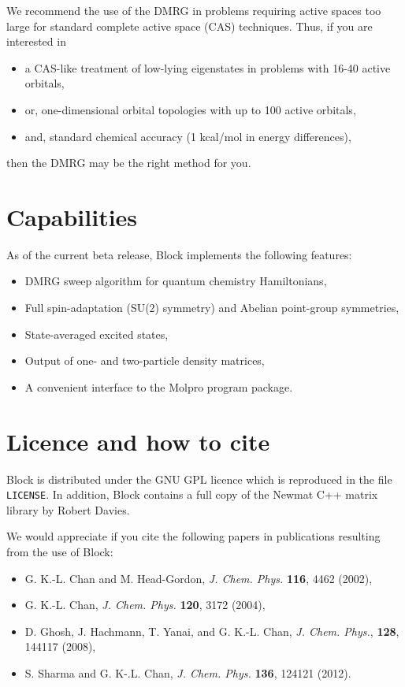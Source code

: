 \documentclass[letterpaper,12pt,aps, pra]{revtex4-1}
\begin{document}
We recommend the use of the DMRG in problems requiring active spaces too large for standard 
complete active space (CAS) techniques. Thus, if you are interested in
\begin{itemize}
\item a CAS-like treatment of low-lying eigenstates in problems with 16-40 active orbitals,
\item or, one-dimensional orbital topologies with up to 100 active orbitals,
\item and, standard chemical accuracy (1 kcal/mol in energy differences),
\end{itemize}
then the DMRG may be the right method for you.

\section{Capabilities}

As of the current beta release, Block implements the following features:
\begin{itemize}
\item DMRG sweep algorithm for quantum chemistry Hamiltonians,
\item Full spin-adaptation (SU(2) symmetry) and Abelian point-group symmetries,
\item State-averaged excited states,
\item Output of one- and two-particle density matrices,
\item A convenient interface to the Molpro program package.
\end{itemize}

\section{Licence and how to cite}\label{sec:papers}

Block is distributed under the GNU GPL licence which is reproduced in the file \texttt{LICENSE}. In addition, Block contains a 
full copy of the Newmat C++ matrix library by Robert Davies.

We would appreciate if you cite the following papers in publications resulting from the use of Block:
\begin{itemize}
 \item G. K.-L. Chan and M. Head-Gordon, \emph{J. Chem. Phys.} \textbf{116}, 4462 (2002),
 \item G. K.-L. Chan, \emph{J. Chem. Phys.} \textbf{120}, 3172 (2004),
 \item D. Ghosh, J. Hachmann, T. Yanai, and G. K.-L. Chan, \emph{J. Chem. Phys.}, {\bf 128}, 144117 (2008),
 \item S. Sharma and G. K-.L. Chan, \emph{J. Chem. Phys.} \textbf{136}, 124121 (2012).
\end{itemize}
\end{document}
